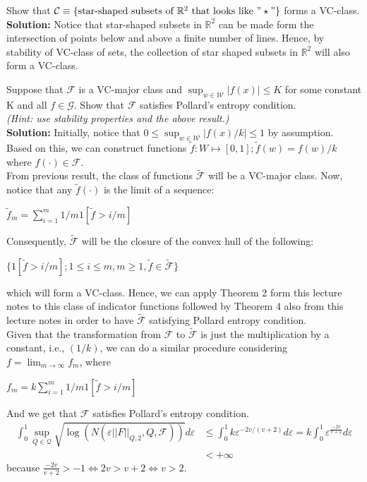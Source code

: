 \documentclass[11pt,letterpaper]{article}                  %
\begin{document}
\bigskip
\begin{problem} Show that $\mathcal{C}\equiv \{\text{star-shaped subsets of } \mathbb{R}^2 \ \text{that looks like } "\star" \}$ forms a VC-class.\\

\textbf{Solution:} Notice that star-shaped subsets in $\mathbb{R}^2$ can be made form the intersection of points below and above a finite number of lines. Hence, by stability of VC-class of sets, the collection of star shaped subsets in $\mathbb{R}^2$ will also form a VC-class.
\end{problem}

\bigskip
\begin{problem} Suppose that $\mathcal{F}$ is a VC-major class and $\sup_{w \in \mathcal{W}} |f(x)| \leq K$ for some constant K and all $f \in \mathcal{G}$. Show that $\mathcal{F}$ satisfies Pollard's entropy condition.\\
\textit{(Hint: use stability properties and the above result.)}\\

\textbf{Solution:} Initially, notice that $0\leq \sup_{w \in \mathcal{W}} |f(x)/k|\leq 1$ by assumption. Based on this, we can construct functions $\tilde{f}:W\mapsto [0,1]; \tilde{f}(w) = f(w)/k$ where $f(\cdot) \in \mathcal{F}$.\\
From previous result, the class of functions $\tilde{\mathcal{F}}$ will be a VC-major class. Now, notice that any $\tilde{f}(\cdot)$ is the limit of a sequence:
\begin{center}
$\tilde{f}_m = \sum_{i=1}^m 1/m 1[\tilde{f}>i/m]$
\end{center}
Consequently, $\tilde{\mathcal{F}}$ will be the closure of the convex hull of the following:
\begin{center}
$\{1[\tilde{f}>i/m]; 1\leq i \leq m, m\geq 1, \tilde{f} \in \tilde{\mathcal{F}}\}$
\end{center}
which will form a VC-class. Hence, we can apply Theorem 2 form this lecture notes to this class of indicator functions followed by Theorem 4 also from this lecture notes in order to have $\tilde{\mathcal{F}}$ satisfying Pollard entropy condition.\\

Given that the transformation from $\mathcal{F}$ to $\tilde{\mathcal{F}}$ is just the multiplication by a constant, i.e., $(1/k)$, we can do a similar procedure considering $f = \lim_{m\to \infty} f_m$, where
\begin{center}
$f_m = k \sum_{i=1}^m 1/m 1[\tilde{f}>i/m]$
\end{center}
And we get that $\mathcal{F}$ satisfies Pollard's entropy condition.
\begin{align*}
\int_0^1 \sup_{Q \in \mathcal{Q}} \sqrt{\log(N(\varepsilon ||F||_{Q,2}, Q, \mathcal{F}))} d\varepsilon &\leq \int_0^1 k \varepsilon^{-2v/(v+2)} d\varepsilon = k \int_0^1 \varepsilon^{\frac{-2v}{v+2}} d\varepsilon \\
&< +\infty
\end{align*}
because $\frac{-2v}{v+2}>-1 \iff 2v > v+2 \iff v>2$.
\end{problem}
\end{document}

